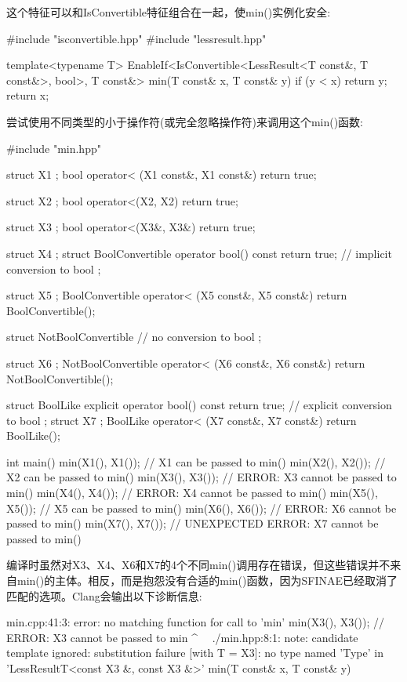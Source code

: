 这个特征可以和IsConvertible特征组合在一起，使min()实例化安全:

\begin{cpp}
#include "isconvertible.hpp"
#include "lessresult.hpp"

template<typename T>
EnableIf<IsConvertible<LessResult<T const&, T const&>, bool>,
		T const&>
min(T const& x, T const& y)
{
	if (y < x) {
		return y;
	}
	return x;
}
\end{cpp}

尝试使用不同类型的小于操作符(或完全忽略操作符)来调用这个min()函数:

\begin{cpp}
#include "min.hpp"

struct X1 { };
bool operator< (X1 const&, X1 const&) { return true; }

struct X2 { };
bool operator<(X2, X2) { return true; }

struct X3 { };
bool operator<(X3&, X3&) { return true; }

struct X4 { };
struct BoolConvertible {
	operator bool() const { return true; } // implicit conversion to bool
};

struct X5 { };
BoolConvertible operator< (X5 const&, X5 const&)
{
	return BoolConvertible();
}

struct NotBoolConvertible { // no conversion to bool
};

struct X6 { };
NotBoolConvertible operator< (X6 const&, X6 const&)
{
	return NotBoolConvertible();
}

struct BoolLike {
	explicit operator bool() const { return true; } // explicit conversion to bool
};
struct X7 { };
BoolLike operator< (X7 const&, X7 const&) { return BoolLike(); }

int main()
{
	min(X1(), X1()); // X1 can be passed to min()
	min(X2(), X2()); // X2 can be passed to min()
	min(X3(), X3()); // ERROR: X3 cannot be passed to min()
	min(X4(), X4()); // ERROR: X4 cannot be passed to min()
	min(X5(), X5()); // X5 can be passed to min()
	min(X6(), X6()); // ERROR: X6 cannot be passed to min()
	min(X7(), X7()); // UNEXPECTED ERROR: X7 cannot be passed to min()
}
\end{cpp}

编译时虽然对X3、X4、X6和X7的4个不同min()调用存在错误，但这些错误并不来自min()的主体。相反，而是抱怨没有合适的min()函数，因为SFINAE已经取消了匹配的选项。Clang会输出以下诊断信息:

\begin{shell}
min.cpp:41:3: error: no matching function for call to 'min'
min(X3(), X3()); // ERROR: X3 cannot be passed to min
^~~
./min.hpp:8:1: note: candidate template ignored: substitution failure
[with T = X3]: no type named 'Type' in
'LessResultT<const X3 &, const X3 &>'
min(T const& x, T const& y)
\end{shell}

